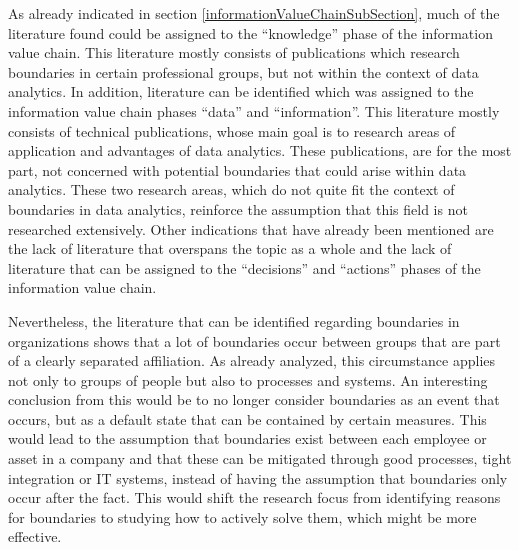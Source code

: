 As already indicated in section \ref{informationValueChainSubSection}, much of the literature found could be assigned to the \enquote{knowledge} phase of the information value chain. This literature mostly consists of publications which research boundaries in certain professional groups, but not within the context of data analytics. In addition, literature can be identified which was assigned to the information value chain phases \enquote{data} and \enquote{information}. This literature mostly consists of technical publications, whose main goal is to research areas of application and advantages of data analytics. These publications, are for the most part, not concerned with potential boundaries that could arise within data analytics. These two research areas, which do not quite fit the context of boundaries in data analytics, reinforce the assumption that this field is not researched extensively. Other indications that have already been mentioned are the lack of literature that overspans the topic as a whole and the lack of literature that can be assigned to the \enquote{decisions} and \enquote{actions} phases of the information value chain. %



Nevertheless, the literature that can be identified regarding boundaries in organizations shows that a lot of boundaries occur between groups that are part of a clearly separated affiliation. As already analyzed, this circumstance applies not only to groups of people but also to processes and systems. An interesting conclusion from this would be to no longer consider boundaries as an event that occurs, but as a default state that can be contained by certain measures. This would lead to the assumption that boundaries exist between each employee or asset in a company and that these can be mitigated through good processes, tight integration or IT systems, instead of having the assumption that boundaries only occur after the fact. This would shift the research focus from identifying reasons for boundaries to studying how to actively solve them, which might be more effective.

